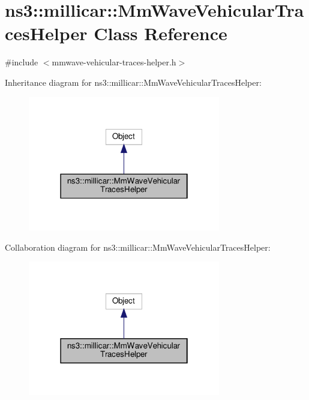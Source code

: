 \hypertarget{classns3_1_1millicar_1_1MmWaveVehicularTracesHelper}{}\section{ns3\+:\+:millicar\+:\+:Mm\+Wave\+Vehicular\+Traces\+Helper Class Reference}
\label{classns3_1_1millicar_1_1MmWaveVehicularTracesHelper}


{\ttfamily \#include $<$mmwave-\/vehicular-\/traces-\/helper.\+h$>$}



Inheritance diagram for ns3\+:\+:millicar\+:\+:Mm\+Wave\+Vehicular\+Traces\+Helper\+:\nopagebreak
\begin{figure}[H]
\begin{center}
\leavevmode
\includegraphics[width=238pt]{classns3_1_1millicar_1_1MmWaveVehicularTracesHelper__inherit__graph}
\end{center}
\end{figure}


Collaboration diagram for ns3\+:\+:millicar\+:\+:Mm\+Wave\+Vehicular\+Traces\+Helper\+:\nopagebreak
\begin{figure}[H]
\begin{center}
\leavevmode
\includegraphics[width=238pt]{classns3_1_1millicar_1_1MmWaveVehicularTracesHelper__coll__graph}
\end{center}
\end{figure}
